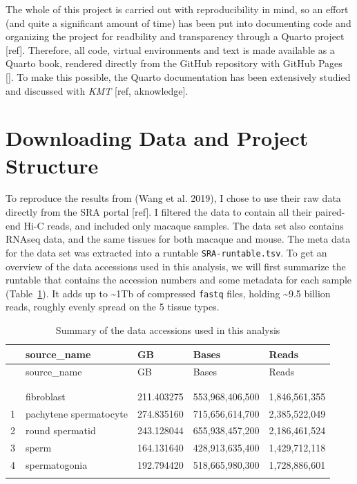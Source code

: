 \documentclass[
  a4paper,
]{scrbook}
\let\oldemph\emph
\renewcommand\emph[1]{\oldemph{\color{gray}#1}}
\begin{document}
The whole of this project is carried out with reproducibility in mind,
so an effort (and quite a significant amount of time) has been put into
documenting code and organizing the project for readbility and
transparency through a Quarto project {[}ref{]}. Therefore, all code,
virtual environments and text is made available as a Quarto book,
rendered directly from the GitHub repository with GitHub Pages {[}{]}.
To make this possible, the Quarto documentation has been extensively
studied and discussed with \emph{KMT} {[}ref, aknowledge{]}.

\section{Downloading Data and Project
Structure}\label{downloading-data-and-project-structure}

To reproduce the results from (Wang et al. 2019), I chose to use their
raw data directly from the SRA portal {[}ref{]}. I filtered the data to
contain all their paired-end Hi-C reads, and included only macaque
samples. The data set also contains RNAseq data, and the same tissues
for both macaque and mouse. The meta data for the data set was extracted
into a runtable \texttt{SRA-runtable.tsv}. To get an overview of the
data accessions used in this analysis, we will first summarize the
runtable that contains the accession numbers and some metadata for each
sample (Table~\ref{tbl-runtable-summary}). It adds up to
\textasciitilde1Tb of compressed \texttt{fastq} files, holding
\textasciitilde9.5 billion reads, roughly evenly spread on the 5 tissue
types.

\begin{longtable}[]{@{}lllll@{}}

\toprule\noalign{}
~ & source\_name & GB & Bases & Reads \\
\midrule\noalign{}
\endfirsthead
\toprule\noalign{}
~ & source\_name & GB & Bases & Reads \\
\midrule\noalign{}
\endhead
\bottomrule\noalign{}
\tabularnewline
\caption{}\label{T_55add}\tabularnewline
\endlastfoot
0 & fibroblast & 211.403275 & 553,968,406,500 & 1,846,561,355 \\
1 & pachytene spermatocyte & 274.835160 & 715,656,614,700 &
2,385,522,049 \\
2 & round spermatid & 243.128044 & 655,938,457,200 & 2,186,461,524 \\
3 & sperm & 164.131640 & 428,913,635,400 & 1,429,712,118 \\
4 & spermatogonia & 192.794420 & 518,665,980,300 & 1,728,886,601 \\


\caption{\label{tbl-runtable-summary}Summary of the data accessions used
in this analysis}

\tabularnewline
\end{longtable}
\end{document}
